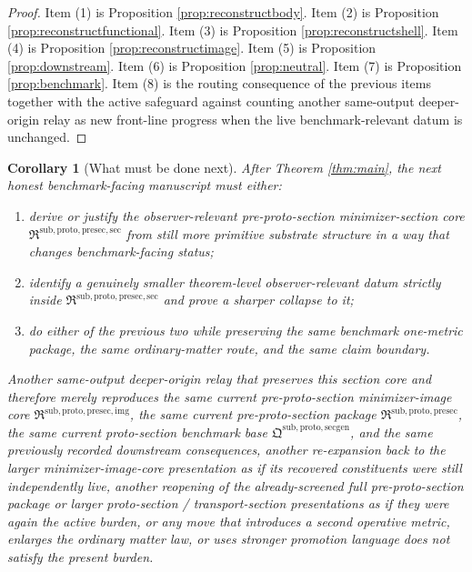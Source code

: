 \documentclass[11pt]{article}
\newcommand{\ProtoSectionPackage}{\mathfrak Q^{\mathrm{sub,proto,secgen}}}
\newcommand{\PreProtoSectionPackage}{\mathfrak R^{\mathrm{sub,proto,presec}}}
\newcommand{\PreProtoSectionImageCore}{\mathfrak R^{\mathrm{sub,proto,presec,img}}}
\newcommand{\PreProtoSectionMinSectionCore}{\mathfrak R^{\mathrm{sub,proto,presec,sec}}}
\newtheorem{corollary}{Corollary}
\begin{document}
\begin{proof}
Item (1) is Proposition \ref{prop:reconstructbody}. Item (2) is Proposition \ref{prop:reconstructfunctional}. Item (3) is Proposition \ref{prop:reconstructshell}. Item (4) is Proposition \ref{prop:reconstructimage}. Item (5) is Proposition \ref{prop:downstream}. Item (6) is Proposition \ref{prop:neutral}. Item (7) is Proposition \ref{prop:benchmark}. Item (8) is the routing consequence of the previous items together with the active safeguard against counting another same-output deeper-origin relay as new front-line progress when the live benchmark-relevant datum is unchanged.
\end{proof}

\begin{corollary}[What must be done next]
\label{cor:next}
After Theorem \ref{thm:main}, the next honest benchmark-facing manuscript must either:
\begin{enumerate}
    \item derive or justify the observer-relevant pre-proto-section minimizer-section core \(\PreProtoSectionMinSectionCore\) from still more primitive substrate structure in a way that changes benchmark-facing status;
    \item identify a genuinely smaller theorem-level observer-relevant datum strictly inside \(\PreProtoSectionMinSectionCore\) and prove a sharper collapse to it;
    \item do either of the previous two while preserving the same benchmark one-metric package, the same ordinary-matter route, and the same claim boundary.
\end{enumerate}
Another same-output deeper-origin relay that preserves this section core and therefore merely reproduces the same current pre-proto-section minimizer-image core \(\PreProtoSectionImageCore\), the same current pre-proto-section package \(\PreProtoSectionPackage\), the same current proto-section benchmark base \(\ProtoSectionPackage\), and the same previously recorded downstream consequences, another re-expansion back to the larger minimizer-image-core presentation as if its recovered constituents were still independently live, another reopening of the already-screened full pre-proto-section package or larger proto-section / transport-section presentations as if they were again the active burden, or any move that introduces a second operative metric, enlarges the ordinary matter law, or uses stronger promotion language does not satisfy the present burden.
\end{corollary}
\end{document}
